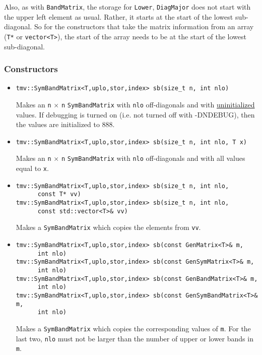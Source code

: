 \documentclass[twoside,letterpaper,11pt]{article}
\renewcommand{\tt}[1]{{\texttt {#1}}}
\begin{document}
Also, as with \tt{BandMatrix}, the storage for \tt{Lower}, \tt{DiagMajor} 
does not start with the upper left element as usual.
Rather, it starts at the start of the lowest sub-diagonal.  
So for the constructors that 
take the matrix information from an array (\tt{T*} or \tt{vector<T>}), 
the start of the array needs to be at the start of the lowest sub-diagonal.  

\subsubsection{Constructors}

\begin{itemize}
\item 
\begin{verbatim}
tmv::SymBandMatrix<T,uplo,stor,index> sb(size_t n, int nlo)
\end{verbatim}
Makes an \tt{n} $\times$ \tt{n} \tt{SymBandMatrix} with 
\tt{nlo} off-diagonals
and with \underline{uninitialized} values.
If debugging is turned on (i.e. not turned off 
with -DNDEBUG), then the values are initialized to 888.

\item
\begin{verbatim}
tmv::SymBandMatrix<T,uplo,stor,index> sb(size_t n, int nlo, T x)
\end{verbatim}
Makes an \tt{n} $\times$ \tt{n} \tt{SymBandMatrix} with \tt{nlo} off-diagonals
and with all values equal to \tt{x}.

\item
\begin{verbatim}
tmv::SymBandMatrix<T,uplo,stor,index> sb(size_t n, int nlo, 
      const T* vv)
tmv::SymBandMatrix<T,uplo,stor,index> sb(size_t n, int nlo, 
      const std::vector<T>& vv)
\end{verbatim}
Makes a \tt{SymBandMatrix} which copies the elements from \tt{vv}.  

\item 
\begin{verbatim}
tmv::SymBandMatrix<T,uplo,stor,index> sb(const GenMatrix<T>& m, 
      int nlo)
tmv::SymBandMatrix<T,uplo,stor,index> sb(const GenSymMatrix<T>& m, 
      int nlo)
tmv::SymBandMatrix<T,uplo,stor,index> sb(const GenBandMatrix<T>& m, 
      int nlo)
tmv::SymBandMatrix<T,uplo,stor,index> sb(const GenSymBandMatrix<T>& m, 
      int nlo)
\end{verbatim}
Makes a \tt{SymBandMatrix} which copies the corresponding values of \tt{m}.  
For the last two, \tt{nlo} must not be larger than the number of upper
or lower bands in \tt{m}.


\end{itemize}
\end{document}
